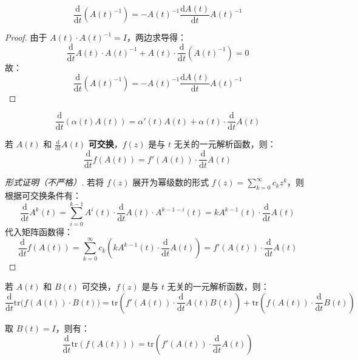 \begin{example}[逆矩阵的导数]
\[
    \frac{\mathrm d}{\mathrm dt}\left(A(t)^{-1}\right)=-A(t)^{-1}\frac{\mathrm dA(t)}{\mathrm dt}A(t)^{-1}
\]
\end{example}
\begin{proof}
由于 $A(t)\cdot A(t)^{-1}=I$，两边求导得：
\[
    \frac{\mathrm d}{\mathrm dt}A(t)\cdot A(t)^{-1}+A(t)\cdot\frac{\mathrm d}{\mathrm dt}\left(A(t)^{-1}\right)=0
\]
故：
\[
    \frac{\mathrm d}{\mathrm dt}\left(A(t)^{-1}\right)=-A(t)^{-1}\frac{\mathrm dA(t)}{\mathrm dt}A(t)^{-1}
\]
\end{proof}

\begin{property}
\[
    \frac{\mathrm d}{\mathrm dt}(\alpha(t)A(t))=\alpha'(t)A(t)+\alpha(t)\cdot\frac{\mathrm d}{\mathrm dt}A(t)
\]
\end{property} 
\begin{property}
若 $A(t)$ 和 $\frac{\mathrm d}{\mathrm dt}A(t)$ \textbf{可交换}，$f(z)$ 是与 $t$ 无关的一元解析函数，则：
\[
    \frac{\mathrm d}{\mathrm dt}f(A(t))=f'(A(t))\cdot\frac{\mathrm d}{\mathrm dt}A(t)
\]
\end{property}
\begin{proof}[形式证明（不严格）]
若将 $f(z)$ 展开为幂级数的形式 $f(z)=\sum_{k=0}^\infty c_kz^k$，则根据可交换条件有：
\[
    \frac{\mathrm d}{\mathrm dt}A^k(t)=\sum_{i=0}^{k-1}A^i(t)\cdot\frac{\mathrm d}{\mathrm dt}A(t)\cdot A^{k-1-i}(t)=kA^{k-1}(t)\cdot\frac{\mathrm d}{\mathrm dt}A(t)
\]
代入矩阵函数得：
\[
    \frac{\mathrm d}{\mathrm dt}f(A(t))=\sum_{k=0}^\infty c_k\left(kA^{k-1}(t)\cdot\frac{\mathrm d}{\mathrm dt}A(t)\right)=f'(A(t))\cdot\frac{\mathrm d}{\mathrm dt}A(t)
\]
\end{proof}

\begin{property}[迹函数求导基本定理]
若 $A(t)$ 和 $B(t)$ 可交换，$f(z)$ 是与 $t$ 无关的一元解析函数，则：
\[
    \frac{\mathrm d}{\mathrm dt}\mathrm{tr}\big(f(A(t))\cdot B(t)\big)=\mathrm{tr}\left(f'(A(t))\cdot\frac{\mathrm d}{\mathrm dt}A(t)B(t)\right)+\mathrm{tr}\left(f(A(t))\cdot\frac{\mathrm d}{\mathrm dt}B(t)\right)
\]
\end{property}
\begin{corollary}
取 $B(t)=I$，则有：
\[
    \frac{\mathrm d}{\mathrm dt}\mathrm{tr}(f(A(t)))=\mathrm{tr}\left(f'(A(t))\cdot\frac{\mathrm d}{\mathrm dt}A(t)\right)
\]
\end{corollary}


